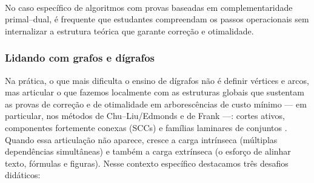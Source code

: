 \documentclass[12pt,a4paper]{article}
\def\emph#1{#1}%
\begin{document}
\paragraph{}
No caso específico de algoritmos com provas baseadas em complementaridade primal--dual, é frequente que estudantes compreendam os passos operacionais sem internalizar a estrutura teórica que garante correção e otimalidade.

\subsubsection{Lidando com grafos e dígrafos}
Na prática, o que mais dificulta o ensino de dígrafos não é definir vértices e arcos, mas articular o que fazemos localmente com as estruturas globais que sustentam as provas de correção e de otimalidade em arborescências de custo mínimo — em particular, nos métodos de Chu–Liu/Edmonds e de Frank —: cortes ativos, componentes fortemente conexas (SCCs) e famílias laminares de conjuntos \cite{bondy2008graph,diestel2017graph,west2001introduction}. Quando essa articulação não aparece, cresce a \emph{carga intrínseca} (múltiplas dependências simultâneas) e também a \emph{carga extrínseca} (o esforço de alinhar texto, fórmulas e figuras). Nesse contexto específico destacamos três desafios didáticos:
\end{document}
